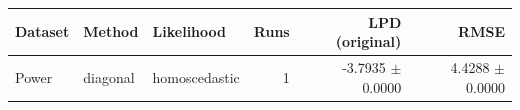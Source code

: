 \begin{tabular}{lllrrr}
\toprule
Dataset & Method & Likelihood & Runs & LPD (original) & RMSE \\
\midrule
Power & diagonal & homoscedastic & 1 & -3.7935 $\pm$ 0.0000 & 4.4288 $\pm$ 0.0000 \\
\bottomrule
\end{tabular}
